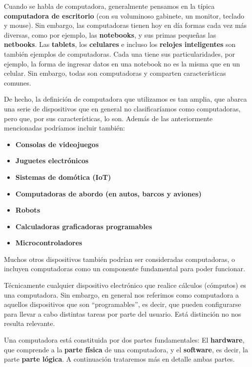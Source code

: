 Cuando se habla de computadora, generalmente pensamos en la típica
\textbf{computadora de escritorio} (con su voluminoso gabinete, un monitor,
teclado y mouse). Sin embargo, las computadoras tienen hoy en día
formas cada vez más diversas, como por ejemplo, las \textbf{notebooks}, y sus
primas pequeñas las \textbf{netbooks}. Las \textbf{tablets}, los \textbf{celulares}
e incluso los \textbf{relojes inteligentes} son también ejemplos de computadoras.
Cada una tiene sus particularidades, por ejemplo, la forma de ingresar datos en
una notebook no es la misma que en un celular. Sin embargo, todas son
computadoras y comparten características comunes.

De hecho, la definición de computadora que utilizamos es tan amplia, que abarca
una serie de dispositivos que en general no clasificaríamos como computadoras,
pero que, por sus características, lo son. Además de las anteriormente
mencionadas podríamos incluir también:

\begin{itemize}
    \item \textbf{Consolas de videojuegos}
    \item \textbf{Juguetes electrónicos}
    \item \textbf{Sistemas de domótica (IoT)}
    \item \textbf{Computadoras de abordo (en autos, barcos y aviones)}
    \item \textbf{Robots}
    \item \textbf{Calculadoras graficadoras programables}
    \item \textbf{Microcontroladores}
\end{itemize}

Muchos otros dispositivos también podrían ser consideradas computadoras, o
incluyen computadoras como un componente fundamental para poder funcionar.
\autocite[introduction]{ceruzzi_2003}

\begin{knowwhat}[En realidad]
Técnicamente cualquier dispositivo electrónico que realice cálculos (cómputos)
es una computadora. Sin embargo, en general nos referimos como computadora a
aquellos dispositivos que son ``programables'', es decir, que pueden configurarse
para llevar a cabo distintas tareas por parte del usuario. Está distinción no
nos resulta relevante.
\end{knowwhat}

Una computadora está constituida por dos partes fundamentales: El
\textbf{hardware}, que comprende a la \textbf{parte física} de una computadora,
y el \textbf{software}, es decir, la parte \textbf{parte lógica}. A continuación
trataremos más en detalle ambas partes.


